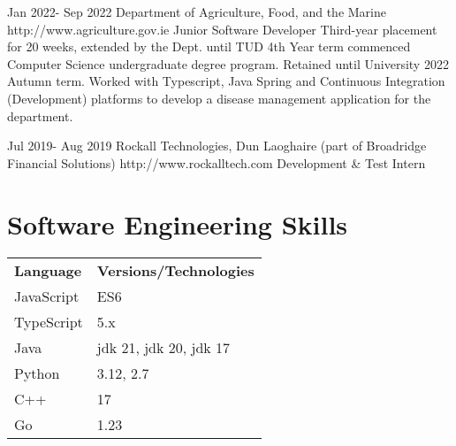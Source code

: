 \documentclass[10pt]{article} %
\begin{document}

\job
{Jan 2022}{- Sep 2022} {Department of Agriculture, Food, and the Marine}
{http://www.agriculture.gov.ie} {Junior Software Developer} {Third-year
placement for 20 weeks, extended by the Dept. until TUD 4th Year term commenced
Computer Science undergraduate degree program. Retained until University 2022
Autumn term. Worked with Typescript, Java Spring and Continuous Integration
(Development) platforms to develop a disease management application for the
department.}


\job
{Jul 2019}{- Aug 2019} {Rockall Technologies, Dun Laoghaire (part of Broadridge
Financial Solutions)} {http://www.rockalltech.com} {Development \& Test Intern}
{}



\newpage
\section{Software Engineering Skills}

{
    \begin{tabular}{l l}
        \textbf{Language} & \textbf{Versions/Technologies} \\
        JavaScript & ES6 \\
        TypeScript & 5.x \\
        Java & jdk 21, jdk 20, jdk 17 \\
        Python & 3.12, 2.7 \\
        C++ & 17 \\
        Go & 1.23 \\
    \end{tabular}
}
\end{document}
